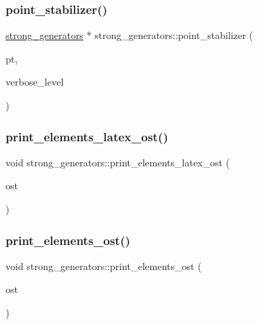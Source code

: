 \mbox{\label{classstrong__generators_ad7ce398640e75836a6a4dde4e305e9e0}} 
\subsubsection{\texorpdfstring{point\+\_\+stabilizer()}{point\_stabilizer()}}
{\footnotesize\ttfamily \mbox{\hyperlink{classstrong__generators}{strong\+\_\+generators}} $\ast$ strong\+\_\+generators\+::point\+\_\+stabilizer (\begin{DoxyParamCaption}\item[{\mbox{\hyperlink{galois_8h_a09fddde158a3a20bd2dcadb609de11dc}{I\+NT}}}]{pt,  }\item[{\mbox{\hyperlink{galois_8h_a09fddde158a3a20bd2dcadb609de11dc}{I\+NT}}}]{verbose\+\_\+level }\end{DoxyParamCaption})}

\mbox{\label{classstrong__generators_ac0c6cadbf23c3fc63d002975a8d13cef}} 
\subsubsection{\texorpdfstring{print\+\_\+elements\+\_\+latex\+\_\+ost()}{print\_elements\_latex\_ost()}}
{\footnotesize\ttfamily void strong\+\_\+generators\+::print\+\_\+elements\+\_\+latex\+\_\+ost (\begin{DoxyParamCaption}\item[{ostream \&}]{ost }\end{DoxyParamCaption})}

\mbox{\label{classstrong__generators_a592bfe2b3b7acdca7afa13f0777bef37}} 
\subsubsection{\texorpdfstring{print\+\_\+elements\+\_\+ost()}{print\_elements\_ost()}}
{\footnotesize\ttfamily void strong\+\_\+generators\+::print\+\_\+elements\+\_\+ost (\begin{DoxyParamCaption}\item[{ostream \&}]{ost }\end{DoxyParamCaption})}

